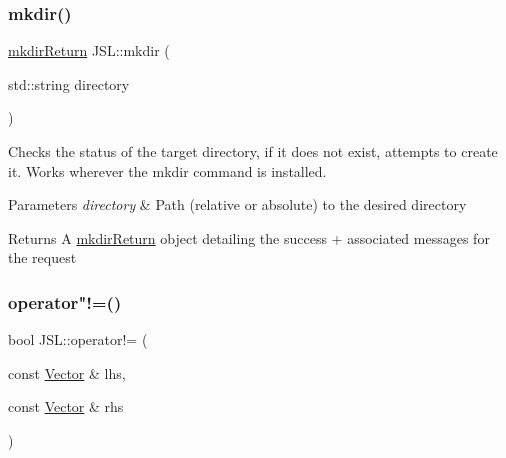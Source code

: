 \mbox{\label{namespaceJSL_abf525d02b8c49f21ef7faa68b7571f93}} 
\subsubsection{\texorpdfstring{mkdir()}{mkdir()}}
{\footnotesize\ttfamily \hyperlink{structJSL_1_1mkdirReturn}{mkdir\+Return} J\+S\+L\+::mkdir (\begin{DoxyParamCaption}\item[{std\+::string}]{directory }\end{DoxyParamCaption})\hspace{0.3cm}{\ttfamily [inline]}}

Checks the status of the target directory, if it does not exist, attempts to create it. Works wherever the {\ttfamily mkdir} command is installed. 
\begin{DoxyParams}{Parameters}
{\em directory} & Path (relative or absolute) to the desired directory \\
\hline
\end{DoxyParams}
\begin{DoxyReturn}{Returns}
A \hyperlink{structJSL_1_1mkdirReturn}{mkdir\+Return} object detailing the success + associated messages for the request 
\end{DoxyReturn}
\mbox{\label{namespaceJSL_a394a4f9cee0747c76d1190b0365c7b5a}} 
\subsubsection{\texorpdfstring{operator"!=()}{operator!=()}\hspace{0.1cm}{\footnotesize\ttfamily [1/2]}}
{\footnotesize\ttfamily bool J\+S\+L\+::operator!= (\begin{DoxyParamCaption}\item[{const \hyperlink{classJSL_1_1Vector}{Vector} \&}]{lhs,  }\item[{const \hyperlink{classJSL_1_1Vector}{Vector} \&}]{rhs }\end{DoxyParamCaption})\hspace{0.3cm}{\ttfamily [inline]}}

\mbox{\label{namespaceJSL_a8b19814a4b6cb667d1e27133acc38513}} 
